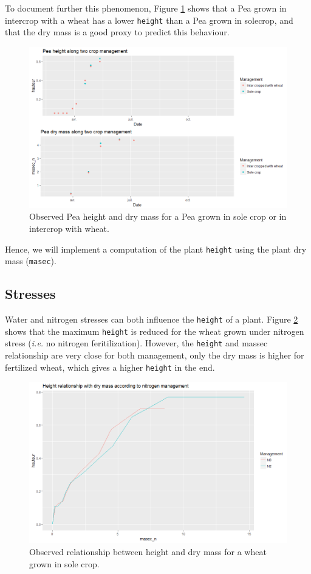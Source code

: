 \documentclass[]{book}
\begin{document}
To document further this phenomenon, Figure \ref{fig:Peaheight} shows that a Pea grown in intercrop with a wheat has a lower \texttt{height} than a Pea grown in solecrop, and that the dry mass is a good proxy to predict this behaviour.

\begin{figure}
\centering
\includegraphics{img/Pea_height.png}
\caption{\label{fig:Peaheight}Observed Pea height and dry mass for a Pea grown in sole crop or in intercrop with wheat.}
\end{figure}

Hence, we will implement a computation of the plant \texttt{height} using the plant dry mass (\texttt{masec}).

\hypertarget{stresses}{%
\subsection{Stresses}\label{stresses}}

Water and nitrogen stresses can both influence the \texttt{height} of a plant. Figure \ref{fig:wheatheightN} shows that the maximum \texttt{height} is reduced for the wheat grown under nitrogen stress (\emph{i.e.} no nitrogen feritilization). However, the \texttt{height} and massec relationship are very close for both management, only the dry mass is higher for fertilized wheat, which gives a higher \texttt{height} in the end.

\begin{figure}
\centering
\includegraphics{img/wheat_height_N.png}
\caption{\label{fig:wheatheightN}Observed relationship between height and dry mass for a wheat grown in sole crop.}
\end{figure}
\end{document}
